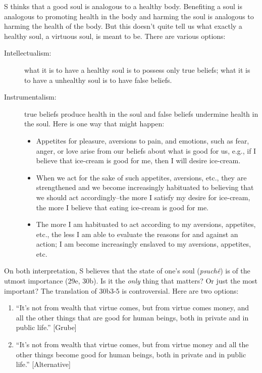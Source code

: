 \documentclass[oneside]{article}
\begin{document}
S thinks that a good soul is analogous to a healthy body. Benefiting a soul is analogous to promoting health in the body and harming the soul is analogous to harming the health of the body.  But this doesn't quite tell us what exactly a healthy soul, a virtuous soul, is meant to be. There are various options: 
\begin{description}
\item[Intellectualism:] what it is to have a healthy soul is to possess only true beliefs; what it is to have a unhealthy soul is to have false beliefs. 
\item[Instrumentalism:] true beliefs produce health in the soul and false beliefs undermine health in the soul. Here is one way that might happen:
\begin{itemize}
\item Appetites  for pleasure, aversions to pain, and emotions, such as fear, anger, or love arise from our beliefs about what is good for us, e.g., if I believe that ice-cream is good for me, then I will desire ice-cream. 
\item When we act for the sake of such appetites, aversions, etc., they are strengthened and we become increasingly habituated to believing that we should act accordingly--the  more I satisfy my desire for ice-cream, the more I believe that eating ice-cream is good for me.
\item The more I am habituated to act according to my aversions, appetites, etc., the less I am able to evaluate the reasons for and against an action; I am become increasingly enslaved to my aversions, appetites, etc. 
\end{itemize}
\end{description}
On both interpretation, S believes that the state of one's soul (\emph{psuch\^{e}}) is of the utmost importance (29e, 30b). Is it the \emph{only} thing that matters? Or just the most important? The translation of 30b3-5 is controversial. Here are two options:
\begin{enumerate}
\item ``It's not from wealth that virtue comes, but from virtue comes money, and all the other things that are good for human beings, both in private and in public life.'' [Grube]
\item  ``It's not from wealth that virtue comes, but from virtue money and all the other things become good for human beings, both in private and in public life.'' [Alternative]
\end{enumerate}
\end{document}
